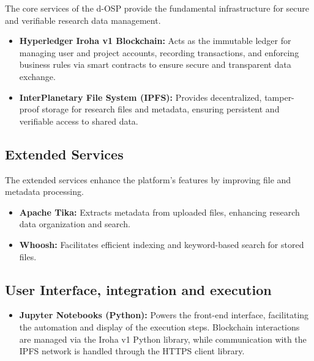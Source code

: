 \documentclass[final]{rc-book-2.14}
\begin{document}
The core services of the d-OSP provide the fundamental infrastructure for secure and verifiable research data management.

\begin{itemize}
    \item \textbf{Hyperledger Iroha v1 Blockchain:} Acts as the immutable ledger for managing user and project accounts, recording transactions, and enforcing business rules via smart contracts to ensure secure and transparent data exchange.
    \item \textbf{InterPlanetary File System (IPFS):} Provides decentralized, tamper-proof storage for research files and metadata, ensuring persistent and verifiable access to shared data.
\end{itemize}

\subsection{Extended Services}

The extended services enhance the platform's features by improving file and metadata processing.

\begin{itemize}
    \item \textbf{Apache Tika:} Extracts metadata from uploaded files, enhancing research data organization and search.
    \item \textbf{Whoosh:} Facilitates efficient indexing and keyword-based search for stored files.
\end{itemize}


\subsection{User Interface, integration and execution}

\begin{itemize}
    \item \textbf{Jupyter Notebooks (Python):} Powers the front-end interface, facilitating the automation and display of the execution steps. Blockchain interactions are managed via the Iroha v1 Python library, while communication with the IPFS network is handled through the HTTPS client library.
\end{itemize}
\end{document}
